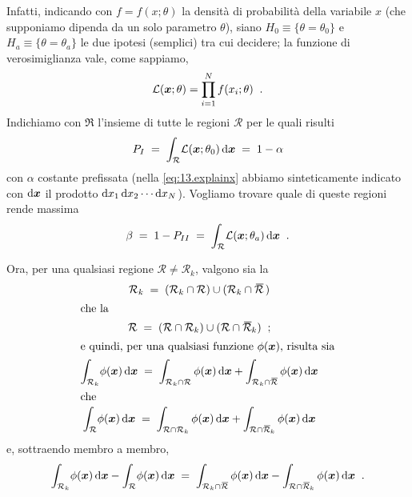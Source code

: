 Infatti, indicando con $f = f(x; \theta)$ la densit\`a di
probabilit\`a della variabile $x$ (che supponiamo dipenda da
un solo parametro $\theta$), siano $H_0 \equiv \{ \theta =
\theta_0 \}$ e $H_a \equiv \{ \theta = \theta_a \}$ le due
ipotesi (semplici) tra cui decidere; la funzione di
verosimiglianza vale, come sappiamo,
\begin{equation*}
  \mathcal{L} (\boldsymbol{x}; \theta) = \prod_{i=1}^N
    f(x_i; \theta) \;\; .
\end{equation*}
Indichiamo con $\Re$ l'insieme di tutte le regioni
$\mathcal{R}$ per le quali risulti
\begin{equation} \label{eq:13.explainx}
  P_I \; = \; \int_\mathcal{R} \! \mathcal{L}
    (\boldsymbol{x}; \theta_0) \, \mathrm{d} \boldsymbol{x} \; = \;
    1 - \alpha
\end{equation}
con $\alpha$ costante prefissata (nella
\eqref{eq:13.explainx} abbiamo sinteticamente indicato con
$\mathrm{d} \boldsymbol{x}$ il prodotto $\mathrm{d} x_1 \, \mathrm{d} x_2 \cdots
\mathrm{d} x_N$).
Vogliamo trovare quale di queste regioni rende massima
\begin{equation*}
  \beta \; = \; 1 - P_{II} \; = \; \int_\mathcal{R} \!
    \mathcal{L} (\boldsymbol{x}; \theta_a) \, \mathrm{d}
    \boldsymbol{x} \;\; .
\end{equation*}

\noindent Ora, per una qualsiasi regione $\mathcal{R} \ne
\mathcal{R}_k$, valgono sia la
\begin{gather*}
  \mathcal{R}_k \; = \; (\mathcal{R}_k \cap \mathcal{R})
    \cup (\mathcal{R}_k \cap \overbar{\mathcal{R}}\,) \\
  \intertext{che la}
  \mathcal{R} \; = \; (\mathcal{R} \cap \mathcal{R}_k) \cup
    (\mathcal{R} \cap \overbar{\mathcal{R}}_k) \peq ; \\
  \intertext{e quindi, per una qualsiasi funzione
    $\phi(\boldsymbol{x})$, risulta sia}
  \int_{\mathcal{R}_k} \! \phi(\boldsymbol{x}) \, \de
    \boldsymbol{x} \; = \; \int_{\mathcal{R}_k \cap
    \mathcal{R}} \phi(\boldsymbol{x}) \, \de \boldsymbol{x}
    + \int_{\mathcal{R}_k \cap \overbar{\mathcal{R}}}
    \phi(\boldsymbol{x}) \, \de \boldsymbol{x} \\
  \intertext{che}
  \int_{\mathcal{R}} \! \phi(\boldsymbol{x}) \, \de
    \boldsymbol{x} \; = \; \int_{\mathcal{R} \cap
    \mathcal{R}_k} \phi(\boldsymbol{x}) \, \de
    \boldsymbol{x} + \int_{\mathcal{R} \cap
    \overbar{\mathcal{R}}_k} \phi(\boldsymbol{x}) \, \de
    \boldsymbol{x}
\end{gather*}
e, sottraendo membro a membro,
\begin{equation} \label{eq:13.neypea2}
  \int_{\mathcal{R}_k} \! \phi(\boldsymbol{x}) \, \de
    \boldsymbol{x} - \int_{\mathcal{R}} \!
    \phi(\boldsymbol{x}) \, \de \boldsymbol{x} \; = \;
    \int_{\mathcal{R}_k \cap \overbar{\mathcal{R}}}
    \phi(\boldsymbol{x}) \, \de \boldsymbol{x} -
    \int_{\mathcal{R} \cap \overbar{\mathcal{R}}_k}
    \phi(\boldsymbol{x}) \, \de \boldsymbol{x} \peq .
\end{equation}

